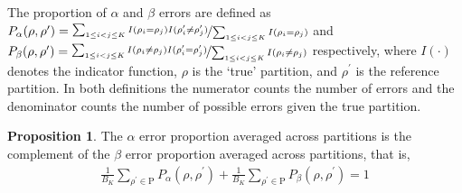 \documentclass[11pt,a4paper]{article}
\theoremstyle{definition} %
\newtheorem{prop}{Proposition}
\theoremstyle{case}
\newcommand{\bellnum}[1]{B_{#1}}
\newcommand{\Rho}{\mathrm{P}} %
\begin{document}
The proportion of $\alpha$ and $\beta$ errors are defined as $P_\alpha(\rho,\rho^\prime) = \nicefrac{\sum_{1\leq i < j \leq K} I(\rho_i=\rho_j)I(\rho^\prime_i\neq\rho^\prime_j)}{\sum_{1\leq i < j \leq K} I(\rho_i=\rho_j)}$ and $P_\beta(\rho,\rho^\prime) = \nicefrac{\sum_{1\leq i < j \leq K} I(\rho_i\neq\rho_j)I(\rho^\prime_i=\rho^\prime_j)}{ \sum_{1\leq i < j \leq K} I(\rho_i\neq\rho_j)}$ respectively, where $I(\cdot)$ denotes the indicator function, $\rho$ is the `true' partition, and $\rho^\prime$ is the reference partition. In both definitions the numerator counts the number of errors and the denominator counts the number of possible errors given the true partition.
\begin{prop}\label{prop:complements}
The $\alpha$ error proportion averaged across partitions is the complement of the $\beta$ error proportion averaged across partitions, that is,
\begin{align}
    \frac{1}{\bellnum{K}}\sum_{\rho^\prime\in\Rho} P_\alpha(\rho,\rho^\prime) + \frac{1}{\bellnum{K}}\sum_{\rho^\prime\in\Rho} P_\beta(\rho,\rho^\prime) = 1
\end{align}
\end{prop}
\end{document}
